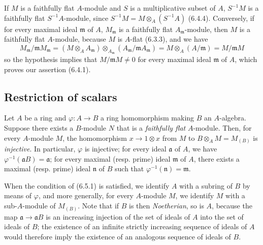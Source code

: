\begin{env}[6.4.5]
\label{0.6.4.5}
If $M$ is a faithfully flat $A$-module and $S$ is a multiplicative
subset of $A$, $S^{-1}M$ is a faithfully flat $S^{-1}A$-module,
since $S^{-1}M=M\otimes_A(S^{-1}A)$ (6.4.4). Conversely, if for every
maximal ideal $\mathfrak{m}$ of $A$, $M_\mathfrak{m}$ is a faithfully flat
$A_\mathfrak{m}$-module, then $M$ is a faithfully flat $A$-module,
because $M$ is $A$-flat (6.3.3), and we have
\[
  M_\mathfrak{m}/\mathfrak{m}M_\mathfrak{m}
  =(M\otimes_A A_\mathfrak{m})
  \otimes_{A_\mathfrak{m}}
  (A_\mathfrak{m}/\mathfrak{m}A_\mathfrak{m})
  =M\otimes_A(A/\mathfrak{m})
  =M/\mathfrak{m}M
\]
so the hypothesis implies that $M/\mathfrak{m}M\neq0$ for every maximal
ideal $\mathfrak{m}$ of $A$, which proves our assertion (6.4.1).
\end{env}

\subsection{Restriction of scalars}
\label{subsection:0.6.5}

\begin{env}[6.5.1]
\label{0.6.5.1}
Let $A$ be a ring and $\varphi:A\to B$ a ring homomorphism making
$B$ an $A$-algebra. Suppose there exists a $B$-module $N$ that is a
\emph{faithfully flat} $A$-module. Then, for every $A$-module $M$,
the homomorphism $x\to 1\otimes x$ from $M$ to
$B\otimes_A M=M_{(B)}$ is \emph{injective}. In particular, $\varphi$ is
injective; for every ideal $\mathfrak{a}$ of $A$, we have
$\varphi^{-1}(\mathfrak{a}B)=\mathfrak{a}$; for every maximal (resp.
prime) ideal $\mathfrak{m}$ of $A$, there exists a maximal (resp. prime) ideal
$\mathfrak{n}$ of $B$ such that $\varphi^{-1}(\mathfrak{n})=\mathfrak{m}$.
\end{env}

\begin{env}[6.5.2]
\label{0.6.5.2}
When the condition of (6.5.1) is satisfied, we identify $A$ with a
subring of $B$ by means of $\varphi$, and more generally, for every $A$-module
$M$, we identify $M$ with a sub-$A$-module of $M_{(B)}$. Note that if
$B$ is then \emph{Noetherian}, so is $A$, because the map
$\mathfrak{a}\to\mathfrak{a}B$ is an increasing injection of
the set of ideals of $A$ into the set of ideals of $B$;
the existence of an infinite strictly increasing sequence of ideals of $A$
would therefore imply the existence of an analogous sequence of ideals of $B$.
\end{env}

